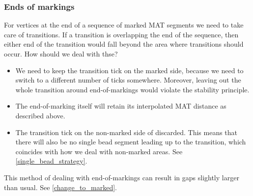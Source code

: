 \subsubsection{Ends of markings}
For vertices at the end of a sequence of marked MAT segments we need to take care of transitions.
If a transition is overlapping the end of the sequence, then either end of the transition would fall beyond the area where transitions should occur.
How should we deal with thse?
\begin{itemize}
\item We need to keep the transition tick on the marked side, because we need to switch to a different number of ticks somewhere.
Moreover, leaving out the whole transition around end-of-markings would violate the stability principle.
\item The end-of-marking itself will retain its interpolated MAT distance as described above.
\item The transition tick on the non-marked side of discarded.
This means that there will also be no single bead segment leading up to the transition, which coincides with how we deal with non-marked areas.
See \cref{single_bead_strategy}.
\end{itemize}
This method of dealing with end-of-markings can result in gaps slightly larger than usual.
See \cref{change_to_marked}.

